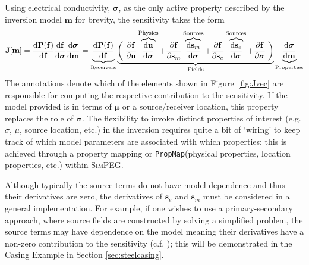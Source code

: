 \documentclass[preprint,review,3p,times,onecolumn,authoryear]{elsarticle}
\newcommand{\SimPEG}{\textsc{SimPEG}\xspace}
\newcommand{\PropMap}{\texttt{PropMap}\xspace}
\newcommand{\sm}{\mathbf{s}_m}
\newcommand{\se}{\mathbf{s}_e}
\begin{document}
Using electrical conductivity, $\boldsymbol{\sigma}$, as the only active
property described by the inversion model $\mathbf{m}$ for brevity, the
sensitivity takes the form
\begin{equation}
\mathbf{J}[\mathbf{m}] =
    \frac{\text{d}\mathbf{P}(\mathbf{f})}{\text{d}\mathbf{f}}
    \frac{\text{d}\mathbf{f}}{\text{d}\boldsymbol{\sigma}}
    \frac{\text{d}\boldsymbol{\sigma}}{\text{d}\mathbf{m}}
=
    \underbrace{
    \frac{\text{d}\mathbf{P}(\mathbf{f})}{\text{d}\mathbf{f}}
    }_{\text{Receivers}}
    \underbrace{
    \left(\vphantom{\frac{\partial\mathbf{f}}{\partial\mathbf{u}}} \right.
\frac{\partial\mathbf{f}}{\partial\mathbf{u}} \overbrace{\frac{\text{d}\mathbf{u}}{\text{d}\boldsymbol{\sigma}}}^{\text{Physics}}
        + \frac{\partial\mathbf{f}}{\partial\sm} \overbrace{\frac{\text{d}\sm}{\text{d}\boldsymbol{\sigma}}}^{\text{Sources}}
        + \frac{\partial\mathbf{f}}{\partial\se} \overbrace{\frac{\text{d}\se}{\text{d}\boldsymbol{\sigma}}}^{\text{Sources}}
        + \frac{\partial\mathbf{f}}{\partial\boldsymbol{\sigma}}
    \left. \vphantom{\frac{\partial\mathbf{f}}{\partial\mathbf{u}}}\right)
     }_{\text{Fields}}
    \underbrace{\frac{\text{d}\boldsymbol{\sigma}}{\text{d}\mathbf{m}}}_{\text{Properties}}
    \label{eq:generalsensitivity}
\end{equation}
The annotations denote which of the elements shown in Figure~\ref{fig:Jvec}
are responsible for computing the respective contribution to the sensitivity.
If the model provided is in terms of $\boldsymbol{\mu}$ or a source/receiver
location, this property replaces the role of $\boldsymbol{\sigma}$. The
flexibility to invoke distinct properties of interest (e.g. $\sigma$, $\mu$,
source location, etc.) in the inversion requires quite a bit of `wiring' to
keep track of which model parameters are associated with which properties;
this is achieved through a property mapping or \PropMap (physical properties,
location properties, etc.) within \SimPEG.

Although typically the source terms do not have model dependence and thus
their derivatives are zero, the derivatives of $\se$ and $\sm$ must be
considered in a general implementation. For example, if one wishes to use a
primary-secondary approach, where source fields are constructed by solving a
simplified problem, the source terms may have dependence on the model meaning
their derivatives have a non-zero contribution to the sensitivity (c.f.
\cite{Coggon1971, Haber2014a, Heagy2015}); this will be
demonstrated in the Casing Example in Section \ref{sec:steelcasing}.
\end{document}
